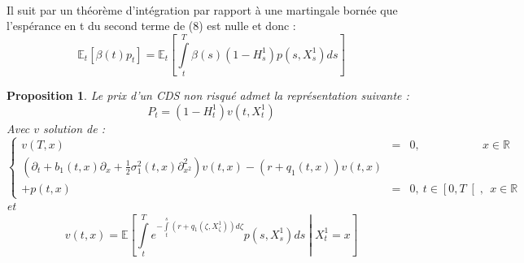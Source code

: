 \documentclass[a4paper]{article}
\newtheorem{proposition}[theorem]{Proposition}
\theoremstyle{definition}
\theoremstyle{remark}
\begin{document}
~~\\
Il suit par un théorème d'intégration par rapport à une martingale bornée que l'espérance en t du second terme de (8) est nulle et donc :
\begin{equation*}
\mathbb{E}_{t} \left[ \beta(t)p_{t} \right] =  \mathbb{E}_{t} \left[ \int \limits_{t}^{T}\beta(s)(1-H^{1}_{s})p(s, X^{1}_s)ds \right]
\end{equation*}
\begin{proposition}
Le prix d'un CDS non risqué admet la représentation suivante :
\begin{equation*}
P_{t}  = (1 - H^1_t)v(t,X_t^1)
\end{equation*}
Avec $v$ solution de :
\begin{equation}
\left\{
\begin{split}
v(T, x) &=& 0,\qquad \qquad \quad \ \ x \in \mathbb{R} \\
\left(\partial_t + b_1(t,x)\partial_{x} + \frac{1}{2}\sigma_1^2(t,x)\partial^2_{x^2}\right)v(t,x) - (r+q_1(t,x))v(t,x) \\+ p(t,x) &=&0, \ t\in\left[0,T\right[,\ \ x \in \mathbb{R}
\end{split}
\right.
\end{equation}
et
\begin{equation}
v(t,x) = \mathbb{E} \left[ \int \limits_t^T e^{-\int \limits_{t}^{s} (r + q_1(\zeta, X^1_\zeta))d\zeta} p(s, X^1_s)ds \middle| X^1_t = x\right]
\end{equation}
\end{proposition}
~~\\
\end{document}
